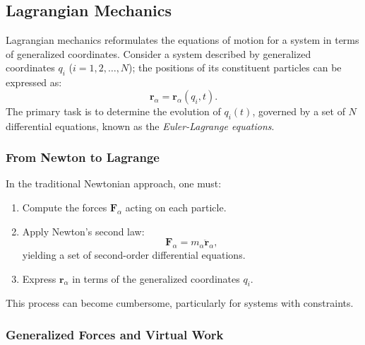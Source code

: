 \subsection{Lagrangian Mechanics}

Lagrangian mechanics reformulates the equations of motion for a system in terms of generalized coordinates. Consider a system described by generalized coordinates \(q_i\) (\(i=1,2,\dots,N\)); the positions of its constituent particles can be expressed as:
\begin{equation}
    \mathbf{r}_\alpha = \mathbf{r}_\alpha(q_i, t).
\end{equation}
The primary task is to determine the evolution of \(q_i(t)\), governed by a set of \(N\) differential equations, known as the \emph{Euler-Lagrange equations}.

\subsubsection*{From Newton to Lagrange}

In the traditional Newtonian approach, one must:
\begin{enumerate}
    \item Compute the forces \(\mathbf{F}_\alpha\) acting on each particle.
    \item Apply Newton's second law:
          \begin{equation}
              \mathbf{F}_\alpha = m_\alpha \ddot{\mathbf{r}}_\alpha,
          \end{equation}
          yielding a set of second-order differential equations.
    \item Express \(\mathbf{r}_\alpha\) in terms of the generalized coordinates \(q_i\).
\end{enumerate}
This process can become cumbersome, particularly for systems with constraints.

\subsubsection*{Generalized Forces and Virtual Work}

